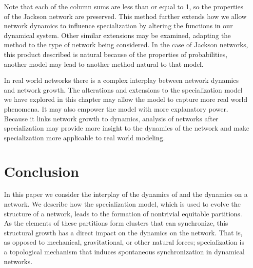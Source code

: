 \documentclass[12pt]{thesis}
\begin{document}
Note that each of the column sums are less than or equal to 1, so the properties of the Jackson network are preserved.
This method further extends how we allow network dynamics to influence specialization by altering the functions in our dynamical system.
Other similar extensions may be examined, adapting the method to the type of network being considered.
In the case of Jackson networks, this product described is natural because of the properties of probabilities, another model may lead to another method natural to that model.

In real world networks there is a complex interplay between network dynamics and network growth.
The alterations and extensions to the specialization model we have explored in this chapter may allow the model to capture more real world phenomena. 
It may also empower the model with more explanatory power.
Because it links network growth to dynamics, analysis of networks after specialization may provide more insight to the dynamics of the network and make specialization more applicable to real world modeling.



\chapter{Conclusion}\label{chapt:conclusion}

In this paper we consider the interplay of the {dynamics of} and the {dynamics on} a network. We describe how the specialization model, which is used to evolve the structure of a network, leads to the formation of nontrivial equitable partitions. As the elements of these partitions form clusters that can synchronize, this structural growth has a direct impact on the {dynamics on} the network. That is, as opposed to mechanical, gravitational, or other natural forces;  specialization is a topological mechanism that induces spontaneous synchronization in dynamical networks.   

\end{document}
